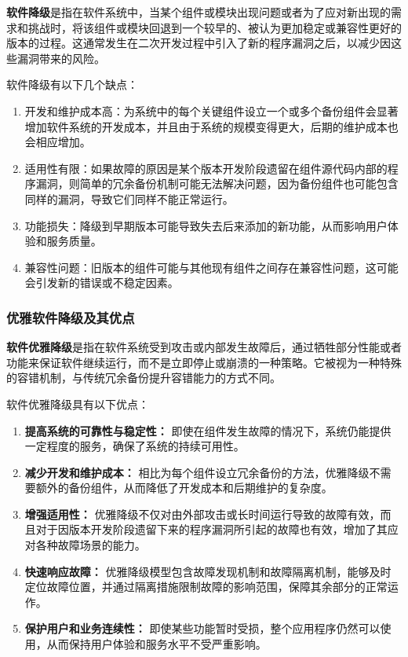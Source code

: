 \documentclass{article}
\begin{document}
\textbf{软件降级}是指在软件系统中，当某个组件或模块出现问题或者为了应对新出现的需求和挑战时，将该组件或模块回退到一个较早的、被认为更加稳定或兼容性更好的版本的过程。这通常发生在二次开发过程中引入了新的程序漏洞之后，以减少因这些漏洞带来的风险。

软件降级有以下几个缺点：

\begin{enumerate}
	\item 开发和维护成本高：为系统中的每个关键组件设立一个或多个备份组件会显著增加软件系统的开发成本，并且由于系统的规模变得更大，后期的维护成本也会相应增加。
	\item 适用性有限：如果故障的原因是某个版本开发阶段遗留在组件源代码内部的程序漏洞，则简单的冗余备份机制可能无法解决问题，因为备份组件也可能包含同样的漏洞，导致它们同样不能正常运行。
	\item 功能损失：降级到早期版本可能导致失去后来添加的新功能，从而影响用户体验和服务质量。
	\item 兼容性问题：旧版本的组件可能与其他现有组件之间存在兼容性问题，这可能会引发新的错误或不稳定因素。
\end{enumerate}

\subsubsection{优雅软件降级及其优点}

\textbf{软件优雅降级}是指在软件系统受到攻击或内部发生故障后，通过牺牲部分性能或者功能来保证软件继续运行，而不是立即停止或崩溃的一种策略。它被视为一种特殊的容错机制，与传统冗余备份提升容错能力的方式不同。

软件优雅降级具有以下优点：

\begin{enumerate}
	\item \textbf{提高系统的可靠性与稳定性：} 即使在组件发生故障的情况下，系统仍能提供一定程度的服务，确保了系统的持续可用性。
	
	\item \textbf{减少开发和维护成本：} 相比为每个组件设立冗余备份的方法，优雅降级不需要额外的备份组件，从而降低了开发成本和后期维护的复杂度。
	
	\item \textbf{增强适用性：} 优雅降级不仅对由外部攻击或长时间运行导致的故障有效，而且对于因版本开发阶段遗留下来的程序漏洞所引起的故障也有效，增加了其应对各种故障场景的能力。
	
	\item \textbf{快速响应故障：} 优雅降级模型包含故障发现机制和故障隔离机制，能够及时定位故障位置，并通过隔离措施限制故障的影响范围，保障其余部分的正常运作。
	
	\item \textbf{保护用户和业务连续性：} 即使某些功能暂时受损，整个应用程序仍然可以使用，从而保持用户体验和服务水平不受严重影响。
\end{enumerate}
\end{document}
